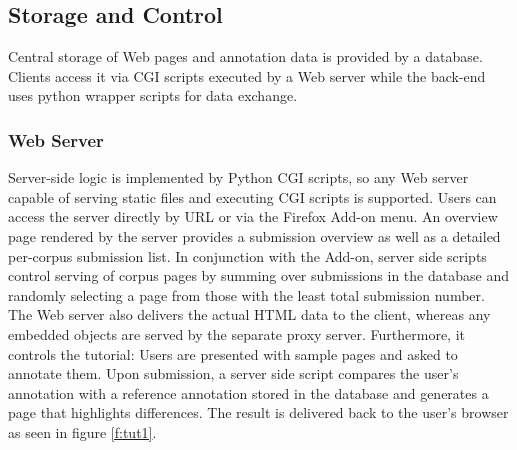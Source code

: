 \subsection{Storage and Control\label{server}}

Central storage of Web pages and annotation data is provided by a database.
Clients access it via CGI scripts executed by a Web server while the back-end uses python wrapper scripts for data exchange.

\subsubsection{Web Server\label{webs}}

Server-side logic is implemented by Python CGI scripts, so any Web server capable of serving static files and executing CGI scripts is supported.
Users can access the server directly by URL or via the Firefox Add-on menu.
An overview page rendered by the server provides a submission overview as well as a detailed per-corpus submission list.
In conjunction with the Add-on, server side scripts control serving of corpus pages by summing over submissions in the database and randomly selecting a page from those with the least total submission number.
The Web server also delivers the actual HTML data to the client, whereas any embedded objects are served by the separate proxy server.
Furthermore, it controls the tutorial: Users are presented with sample pages and asked to annotate them.
Upon submission, a server side script compares the user's annotation with a reference annotation stored in the database and generates a page that highlights differences.
The result is delivered back to the user's browser as seen in figure \ref{f:tut1}.

